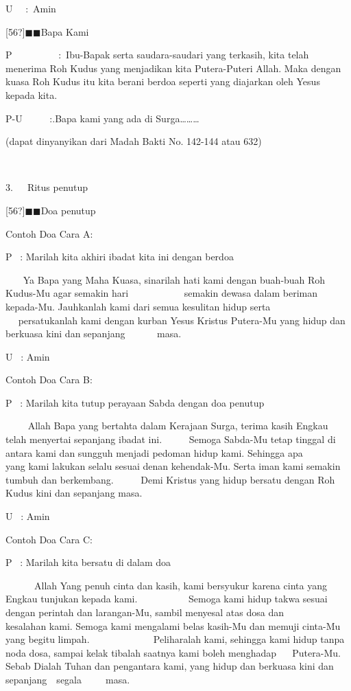 \documentclass{article}
\begin{document}
U~~ :~Amin

[56?]${\blacksquare}{\blacksquare}$Bapa Kami

P~~~~~~~~~ :~Ibu-Bapak serta saudara-saudari yang terkasih, kita telah menerima Roh Kudus yang menjadikan kita
Putera-Puteri Allah. Maka dengan kuasa Roh Kudus itu kita berani berdoa seperti yang diajarkan oleh Yesus kepada kita.

P-U~~~~~ :.Bapa kami yang ada di Surga{\dots}{\dots}{\dots}

(dapat dinyanyikan dari Madah Bakti No. 142-144 atau 632)

~~

3.~~~Ritus penutup

[56?]${\blacksquare}{\blacksquare}$Doa penutup

Contoh Doa Cara A:

P~ : Marilah kita akhiri ibadat kita ini dengan berdoa

~ ~~Ya Bapa yang Maha Kuasa, sinarilah hati kami dengan buah-buah Roh Kudus-Mu agar semakin hari ~ ~ ~ ~ ~ ~ ~semakin
dewasa dalam beriman kepada-Mu. Jauhkanlah kami dari semua kesulitan hidup serta ~ ~ ~ ~ ~ ~ ~ ~ ~ ~ ~ ~persatukanlah
kami dengan kurban Yesus Kristus Putera-Mu yang hidup dan berkuasa kini dan sepanjang ~ ~ ~ ~masa.

U~ : Amin

Contoh Doa Cara B:

P~ : Marilah kita tutup perayaan Sabda dengan doa penutup

~~~ ~Allah Bapa yang bertahta dalam Kerajaan Surga, terima kasih Engkau telah menyertai sepanjang ibadat ini. ~ ~ ~
Semoga Sabda-Mu tetap tinggal di antara kami dan sungguh menjadi pedoman hidup kami. Sehingga apa ~ ~ ~ ~ yang kami
lakukan selalu sesuai denan kehendak-Mu. Serta iman kami semakin tumbuh dan berkembang. ~ ~ ~ Demi Kristus yang hidup
bersatu dengan Roh Kudus kini dan sepanjang masa.

U~ : Amin

Contoh Doa Cara C:

P~ : Marilah kita bersatu di dalam doa

~ ~ ~ ~Allah Yang penuh cinta dan kasih, kami bersyukur karena cinta yang Engkau tunjukan kepada kami. ~ ~ ~ ~ ~ ~
Semoga kami hidup takwa sesuai dengan perintah dan larangan-Mu, sambil menyesal atas dosa dan ~ ~ ~ ~ ~ ~ ~ ~ kesalahan
kami. Semoga kami mengalami belas kasih-Mu dan memuji cinta-Mu yang begitu limpah. ~ ~ ~ ~ ~ ~ ~ ~Peliharalah kami,
sehingga kami hidup tanpa noda dosa, sampai kelak tibalah saatnya kami boleh menghadap ~ ~Putera-Mu. Sebab Dialah Tuhan
dan pengantara kami, yang hidup dan berkuasa kini dan sepanjang~~segala ~ ~ ~masa.
\end{document}
